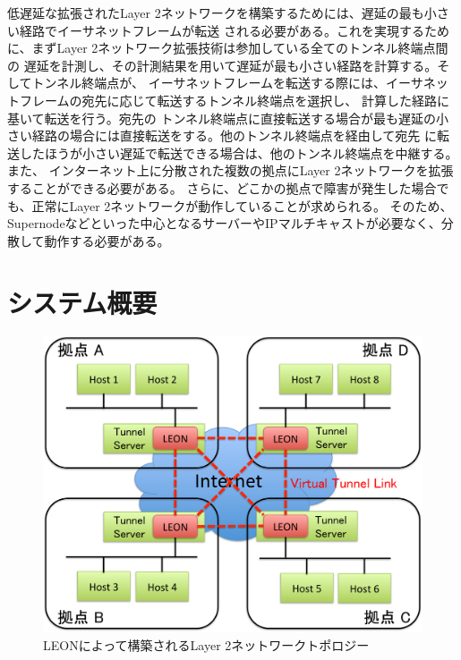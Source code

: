 低遅延な拡張されたLayer 2ネットワークを構築するためには、遅延の最も小さい経路でイーサネットフレームが転送
される必要がある。これを実現するために、まずLayer 2ネットワーク拡張技術は参加している全てのトンネル終端点間の
遅延を計測し、その計測結果を用いて遅延が最も小さい経路を計算する。そしてトンネル終端点が、
イーサネットフレームを転送する際には、イーサネットフレームの宛先に応じて転送するトンネル終端点を選択し、
計算した経路に基いて転送を行う。宛先の
トンネル終端点に直接転送する場合が最も遅延の小さい経路の場合には直接転送をする。他のトンネル終端点を経由して宛先
に転送したほうが小さい遅延で転送できる場合は、他のトンネル終端点を中継する。また、
インターネット上に分散された複数の拠点にLayer 2ネットワークを拡張することができる必要がある。
さらに、どこかの拠点で障害が発生した場合でも、正常にLayer 2ネットワークが動作していることが求められる。
そのため、Supernodeなどといった中心となるサーバーやIPマルチキャストが必要なく、分散して動作する必要がある。

\section{システム概要}
\label{solv:requiredl2}

\begin{figure}
	\begin{center}
		\includegraphics[scale=0.60]{./img/mtuntopology}
		\caption{LEONによって構築されるLayer 2ネットワークトポロジー}
		\label{img:mtuntopology}
	\end{center}
\end{figure}


